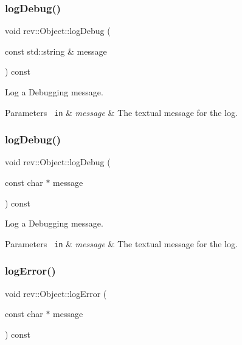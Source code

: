 \subsubsection{\texorpdfstring{logDebug()}{logDebug()}\hspace{0.1cm}{\footnotesize\ttfamily [1/2]}}
{\footnotesize\ttfamily void rev\+::\+Object\+::log\+Debug (\begin{DoxyParamCaption}\item[{const std\+::string \&}]{message }\end{DoxyParamCaption}) const\hspace{0.3cm}{\ttfamily [inline]}}



Log a Debugging message. 


\begin{DoxyParams}[1]{Parameters}
\mbox{\texttt{ in}}  & {\em message} & The textual message for the log. \\
\hline
\end{DoxyParams}
\mbox{\label{classrev_1_1_object_a5b0b84e3b2afd5ecd44bb6c78859e38b}} 
\subsubsection{\texorpdfstring{logDebug()}{logDebug()}\hspace{0.1cm}{\footnotesize\ttfamily [2/2]}}
{\footnotesize\ttfamily void rev\+::\+Object\+::log\+Debug (\begin{DoxyParamCaption}\item[{const char $\ast$}]{message }\end{DoxyParamCaption}) const\hspace{0.3cm}{\ttfamily [inline]}}



Log a Debugging message. 


\begin{DoxyParams}[1]{Parameters}
\mbox{\texttt{ in}}  & {\em message} & The textual message for the log. \\
\hline
\end{DoxyParams}
\mbox{\label{classrev_1_1_object_a4559ef458b76ee917de6112f5a9dfdca}} 
\subsubsection{\texorpdfstring{logError()}{logError()}\hspace{0.1cm}{\footnotesize\ttfamily [1/2]}}
{\footnotesize\ttfamily void rev\+::\+Object\+::log\+Error (\begin{DoxyParamCaption}\item[{const char $\ast$}]{message }\end{DoxyParamCaption}) const\hspace{0.3cm}{\ttfamily [inline]}}



